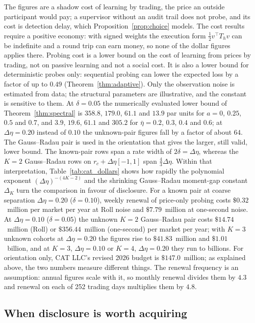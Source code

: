 \documentclass[12pt]{article}
\theoremstyle{definition}
\theoremstyle{remark}
\begin{document}
The figures are a shadow cost of learning by trading, the price an outside participant would pay; a supervisor without an audit trail does not probe, and its cost is detection delay, which Proposition~\ref{prop:choice} models. The cost results require a positive economy: with signed weights the execution form $\tfrac12v^\top T_hv$ can be indefinite and a round trip can earn money, so none of the dollar figures applies there. Probing cost is a lower bound on the cost of learning from prices by trading, not on passive learning and not a social cost. It is also a lower bound for deterministic probes only: sequential probing can lower the expected loss by a factor of up to $0.49$ (Theorem~\ref{thm:adaptive}). Only the observation noise is estimated from data; the structural parameters are illustrative, and the constant is sensitive to them. At $\delta=0.05$ the numerically evaluated lower bound of Theorem~\ref{thm:spectral} is $358.8$, $179.0$, $61.1$ and $13.9$ par units for $a=0$, $0.25$, $0.5$ and $0.7$, and $3.9$, $19.6$, $61.1$ and $305.2$ for $\bar\eta=0.2$, $0.3$, $0.4$ and $0.6$; at $\Delta\eta=0.20$ instead of $0.10$ the unknown-pair figures fall by a factor of about $64$. The Gauss--Radau pair is used in the orientation that gives the larger, still valid, lower bound. The known-pair rows span a rate width of $2\delta=\Delta\eta$, whereas the $K=2$ Gauss--Radau rows on $r_c+\Delta\eta[-1,1]$ span $\tfrac43\Delta\eta$. Within that interpretation, Table~\ref{tab:cat_dollars} shows how rapidly the polynomial exponent $(\Delta\eta)^{-(4K-2)}$ and the shrinking Gauss--Radau moment-gap constant $\Delta_K$ turn the comparison in favour of disclosure. For a known pair at coarse separation $\Delta\eta=0.20$ ($\delta=0.10$), weekly renewal of price-only probing costs $\$0.32$~million per market per year at Roll noise and $\$7.79$~million at one-second noise. At $\Delta\eta=0.10$ ($\delta=0.05$) the unknown $K=2$ Gauss--Radau pair costs $\$14.74$~million (Roll) or $\$356.44$~million (one-second) per market per year; with $K=3$ unknown cohorts at $\Delta\eta=0.20$ the figures rise to $\$41.83$~million and $\$1.01$~billion, and at $K=3$, $\Delta\eta=0.10$ or $K=4$, $\Delta\eta=0.20$ they run to billions. For orientation only, CAT LLC's revised 2026 budget is $\$147.0$~million; as explained above, the two numbers measure different things. The renewal frequency is an assumption: annual figures scale with it, so monthly renewal divides them by $4.3$ and renewal on each of 252 trading days multiplies them by $4.8$.

\subsection{When disclosure is worth acquiring}\label{sec:decision}
\end{document}
